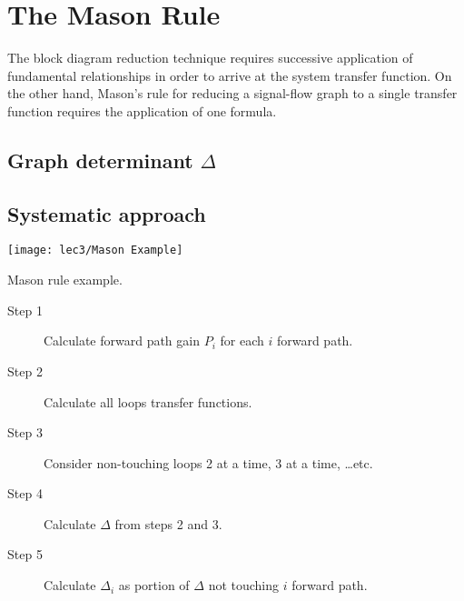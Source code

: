 \section[The Mason Rule]{The Mason Rule}

The block diagram reduction technique requires successive application of fundamental relationships in order to arrive at the system transfer function.
On the other hand, Mason's rule for reducing a signal-flow graph to a single transfer function requires the application of one formula.


\hspace*{\fill}


\subsection[Graph determinant]{Graph determinant $\Delta$}
\blindtext


\subsection{Systematic approach}

\begin{marginfigure}
		\raggedleft
		\texttt{[image: lec3/Mason Example]}
		\caption{Mason rule example.}
\end{marginfigure}

\begin{description}
	\item[Step 1]  Calculate forward path gain $P_i$ for each $i$ forward path.
	\item[Step 2]  Calculate all loops transfer functions.
	\item[Step 3]  Consider non-touching loops 2 at a time, 3 at a time, \ldots etc.
	\item[Step 4]  Calculate $\Delta$ from steps 2 and 3.
	\item[Step 5]  Calculate $\Delta_i$ as portion of $\Delta$ not touching $i$ forward path.
\end{description}

